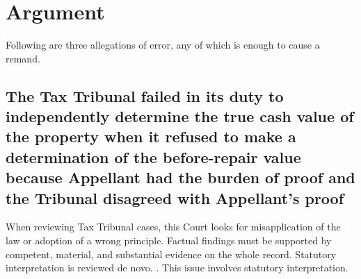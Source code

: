 \documentclass[12pt,\documentclassflag]{michiganCourtOfAppealsBrief}
\begin{document}




\section{Argument}
 
Following are three allegations of error, any of which is enough to cause a remand. 

\subsection{The Tax Tribunal failed in its duty to independently determine the true cash value of the property when it refused to make a determination of the before-repair value because Appellant had the burden of proof and the Tribunal disagreed with Appellant's proof 
}

When reviewing Tax Tribunal cases, this Court looks for misapplication of the law or adoption of a wrong principle. Factual findings must be supported by competent, material, and substantial evidence on the whole record. Statutory interpretation is reviewed de novo. . This issue involves statutory interpretation.
\end{document}
